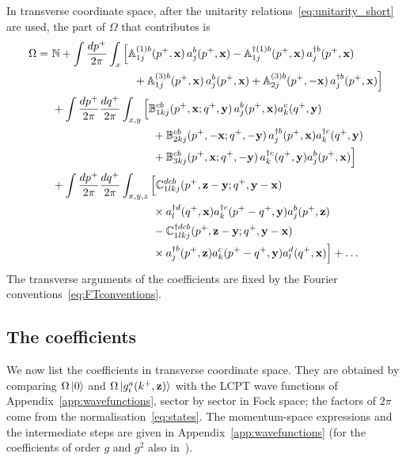 In transverse coordinate space, after the unitarity relations~\eqref{eq:unitarity_short} are used, the part of $\Omega$ that contributes is
\begin{align}\label{eq:OmegaX}
\Omega = \ &\mf N
+\int\frac{dp^+}{2\pi}\int_x\Big[\mf A^{(1)b}_{1j}(p^+,\v x)\,a^b_j(p^+,\v x)-\mf A^{\dagger(1)b}_{1j}(p^+,\v x)\,a^{\dagger b}_j(p^+,\v x)
\notag\\&\hspace{2.6cm}
+\mf A^{(3)b}_{1j}(p^+,\v x)\,a^b_j(p^+,\v x)+\mf A^{(3)b}_{2j}(p^+,-\v x)\,a^{\dagger b}_j(p^+,\v x)\Big]
\notag\\&
+\int\frac{dp^+}{2\pi}\frac{dq^+}{2\pi}\int_{x,y}\Big[\mf B^{cb}_{1kj}(p^+,\v x;q^+,\v y)\,a^b_j(p^+,\v x)a^c_k(q^+,\v y)
\notag\\&\hspace{3.2cm}
+\mf B^{cb}_{2kj}(p^+,-\v x;q^+,-\v y)\,a^{\dagger b}_j(p^+,\v x)a^{\dagger c}_k(q^+,\v y)
\notag\\&\hspace{3.2cm}
+\mf B^{cb}_{3kj}(p^+,\v x;q^+,-\v y)\,a^{\dagger c}_k(q^+,\v y)a^b_j(p^+,\v x)\Big]
\notag\\&
+\int\frac{dp^+}{2\pi}\frac{dq^+}{2\pi}\int_{x,y,z}\Big[\mf C^{dcb}_{1lkj}(p^+,\v z-\v y;q^+,\v y-\v x)
\notag\\&\hspace{3.2cm}\times a^{\dagger d}_l(q^+,\v x)a^{\dagger c}_k(p^+-q^+,\v y)a^b_j(p^+,\v z)
\notag\\&\hspace{3.2cm}
-\mf C^{\dagger dcb}_{1lkj}(p^+,\v z-\v y;q^+,\v y-\v x)
\notag\\&\hspace{3.2cm}\times a^{\dagger b}_j(p^+,\v z)a^c_k(p^+-q^+,\v y)a^d_l(q^+,\v x)\Big]+\dots
\end{align}
The transverse arguments of the coefficients are fixed by the Fourier conventions~\eqref{eq:FTconventions}.

\subsection{The coefficients}\label{sec:coefficients}

We now list the coefficients in transverse coordinate space. They are obtained by comparing $\Omega\ket0$ and $\Omega\ket{g^a_i(k^+,\mathbf{z})}$ with the LCPT wave functions of Appendix~\ref{app:wavefunctions}, sector by sector in Fock space; the factors of $2\pi$ come from the normalisation~\eqref{eq:states}. The momentum-space expressions and the intermediate steps are given in Appendix~\ref{app:wavefunctions} (for the coefficients of order $g$ and $g^2$ also in~\cite{Radhakrishnan:2026soft}).

